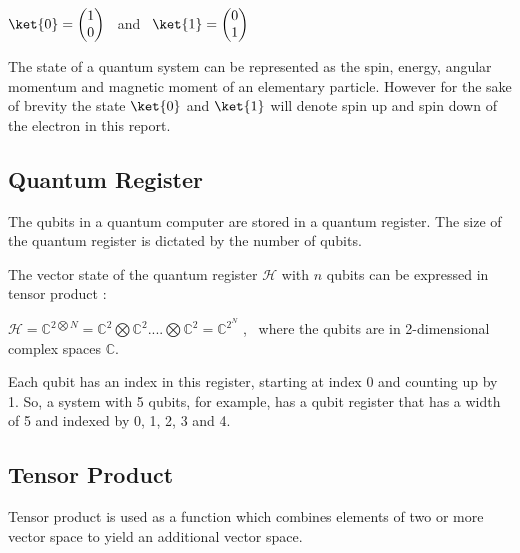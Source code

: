 \documentclass{article}
\begin{document}
\qquad $\ket{0} = \begin{pmatrix}1 \\ 0 \end{pmatrix}$ \ and \ $\ket{1} = \begin{pmatrix} 0 \\ 1 \end{pmatrix}$

\vspace{5mm}

\noindent
The state of a quantum system can be represented as the spin, energy, angular momentum and magnetic moment of an elementary particle. However for the sake of brevity the state $\ket{0}$ and $\ket{1}$ will denote spin up and spin down of the electron in this report.
\pagebreak

\subsection{Quantum Register}
\vspace{5mm}

\noindent
The qubits in a quantum computer are stored in a quantum register. The size of the quantum register is dictated by the number of qubits. 
\vspace{5mm}

\noindent
The vector state of the quantum register $\mathcal{H}$ with $n$ qubits can be expressed in tensor product \cite{noauthor_lecture_nodate}:
\vspace{5mm}


\qquad $\mathcal{H} = \mathbb{C}^{2\bigotimes N} = \mathbb{C}^2 \bigotimes\mathbb{C}^2 ....\bigotimes\mathbb{C}^2 = \mathbb{C}^{2^N} $ , \  where the qubits are in 2-dimensional complex spaces $\mathbb{C}$.
\vspace{5mm}

\noindent
Each qubit has an index in this register, starting at index 0 and counting up by 1. So, a system with 5 qubits, for example, has a qubit register that has a width of 5 and indexed by 0, 1, 2, 3 and 4.

\subsection{Tensor Product}
\vspace{5mm}

\noindent
Tensor product is used as a function which combines elements of two or more vector space to yield an additional vector space. 
\vspace{5mm}
\end{document}
